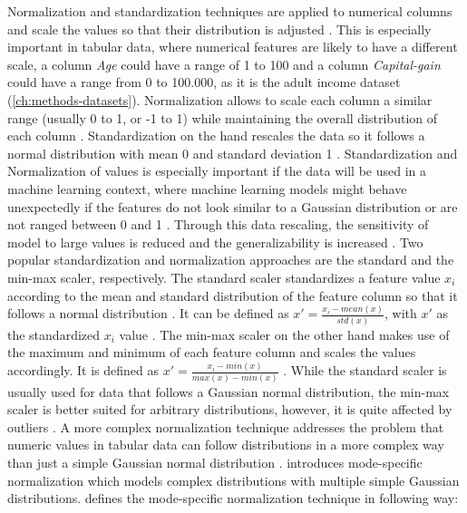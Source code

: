 Normalization and standardization techniques are applied to numerical columns and scale the values so that their distribution is adjusted \cite{garcia2016BigDataPreprocessing}.
This is especially important in tabular data, where numerical features are likely to have a different scale, \eg a column \textit{Age} could have a range of 1 to 100 and a column \textit{Capital-gain} could have a range from 0 to 100.000, as it is the adult income dataset \cite{Dua:2019} (\autoref{ch:methods-datasets}).
Normalization allows to scale each column a similar range (usually 0 to 1, or -1 to 1) while maintaining the overall distribution of each column \cite{izonin2022TwoStepDataNormalization}.
Standardization on the hand rescales the data so it follows a normal distribution with mean 0 and standard deviation 1 \cite{scikit-learndevelopers2023PreprocessingData}.
Standardization and Normalization of values is especially important if the data will be used in a machine learning context, where machine learning models might behave unexpectedly if 
the features do not look similar to a Gaussian distribution or are not ranged between 0 and 1 \cite{scikit-learn, scikit-learndevelopers2023PreprocessingData}.
Through this data rescaling, the sensitivity of model to large values is reduced and the generalizability is increased \cite{izonin2022TwoStepDataNormalization}.
Two popular standardization and normalization approaches are the standard and the min-max scaler, respectively.
The standard scaler standardizes a feature value $x_i$ according to the mean and standard distribution of the feature column so that it follows a normal distribution \cite{garcia2016BigDataPreprocessing, izonin2022TwoStepDataNormalization}.
It can be defined as $x' = \frac{x_i-mean(x)}{std(x)}$, with $x'$ as the standardized $x_i$ value \cite{izonin2022TwoStepDataNormalization}.
The min-max scaler on the other hand makes use of the maximum and minimum of each feature column and scales the values accordingly.
It is defined as $x' = \frac{x_i - min(x)}{max(x) - min(x)}$ \cite{izonin2022TwoStepDataNormalization}.
While the standard scaler is usually used for data that follows a Gaussian normal distribution, the min-max scaler is better suited for arbitrary distributions, however, it is quite affected by outliers \cite{choudhury2020FeatureScalingEffect}.
A more complex normalization technique addresses the problem that numeric values in tabular data can follow distributions in a more complex way than just a simple Gaussian normal distribution \cite{zhao2022CTABGANEnhancingTabular, xu2019ModelingTabularData}.
\cite{xu2019ModelingTabularData} introduces mode-specific normalization which models complex distributions with multiple simple Gaussian distributions.
\cite[p. 3-4]{xu2019ModelingTabularData} defines the mode-specific normalization technique in following way:

